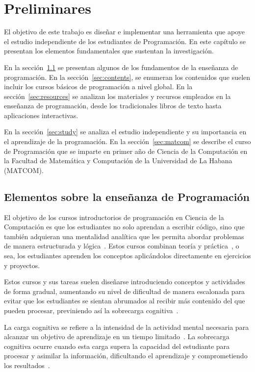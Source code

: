 \chapter{Preliminares}\label{chapter:background}

El objetivo de este trabajo es diseñar e implementar una herramienta que apoye el estudio independiente de los estudiantes de Programación. En este capítulo se presentan los elementos fundamentales que sustentan la investigación.

En la sección~\ref{sec:ensenanza_programacion} se presentan algunos de los fundamentos de la enseñanza de programación. En la sección~\ref{sec:contents}, se enumeran los contenidos que suelen incluir los cursos básicos de programación a nivel global. En la sección~\ref{sec:resources} se analizan los materiales y recursos empleados en la enseñanza de programación, desde los tradicionales libros de texto hasta aplicaciones interactivas.

En la sección~\ref{sec:study} se analiza el estudio independiente y su importancia en el aprendizaje de la programación. En la sección~\ref{sec:matcom} se describe el curso de Programación que se imparte en primer año de Ciencia de la Computación en la Facultad de Matemática y Computación de la Universidad de La Habana (\mbox{MATCOM}).

\section{Elementos sobre la enseñanza de Programación}\label{sec:ensenanza_programacion}

El objetivo de los cursos introductorios de programación en Ciencia de la Computación es que los estudiantes no solo aprendan a escribir código, sino que también adquieran una mentalidad analítica que les permita abordar problemas de manera estructurada y lógica~\cite{JOHNLEMAY2021100056}. Estos cursos combinan teoría y práctica~\cite{Sarsa_2022}, o sea, los estudiantes aprenden los conceptos aplicándolos directamente en ejercicios y proyectos.

Estos cursos y sus tareas suelen diseñarse introduciendo conceptos y actividades de forma gradual, aumentando su nivel de dificultad de manera escalonada para evitar que los estudiantes se sientan abrumados al recibir más contenido del que pueden procesar, previniendo así la sobrecarga cognitiva~\cite{duran2021clt}.

La carga cognitiva se refiere a la intensidad de la actividad mental necesaria para alcanzar un objetivo de aprendizaje en un tiempo limitado~\cite{duran2021clt}. La sobrecarga cognitiva ocurre cuando esta carga supera la capacidad del estudiante para procesar y asimilar la información, dificultando el aprendizaje y comprometiendo los resultados~\cite{duran2021clt}. 

